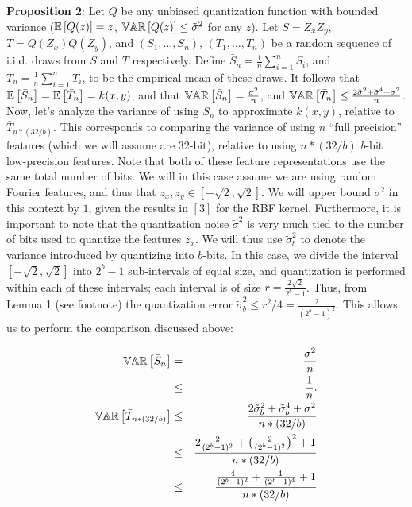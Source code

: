 \documentclass[12pt]{article}
\newcommand{\bS}{\bar{S}}
\newcommand{\bT}{\bar{T}}
\newcommand{\sq}{\sqrt{2}}
\newcommand{\tsigma}{\tilde{\sigma}}
\begin{document}
\noindent\textbf{Proposition 2}: Let $Q$ be any unbiased quantization function with bounded variance ($\expect{}{Q(z)} = z$, $\var{}{Q(z)} \leq \tsigma^2$ for any $z$).  Let $S=Z_x Z_y$, $T = Q(Z_x)Q(Z_y)$, and $(S_1,\ldots,S_n)$, $(T_1,\ldots,T_n)$ be a random sequence of i.i.d. draws from $S$ and $T$ respectively.  Define $\bar{S}_n = \frac{1}{n}\sum_{i=1}^n S_i$, and $\bar{T}_n =  \frac{1}{n}\sum_{i=1}^n T_i$, to be the empirical mean of these draws.  It follows that $\expect{}{\bS_n} = \expect{}{\bT_n} = k(x,y)$, and that
$\var{}{\bS_n} = \frac{\sigma^2}{n}$, and $\var{}{\bT_n} \leq \frac{2\tsigma^2 + \tsigma^4 +  \sigma^2}{n}$.\\

Now, let's analyze the variance of using $\bS_n$ to approximate $k(x,y)$, relative to $\bT_{n*(32/b)}$.  This corresponds to comparing the variance of using $n$ ``full precision''  features (which we will assume are 32-bit), relative to using $n*(32/b)$ $b$-bit low-precision features. Note that both of these feature representations use the same total number of bits.  We will in this case assume we are using random Fourier features, and thus that
$z_x,z_y \in [-\sq,\sq]$.  We will upper bound $\sigma^2$ in this context by $1$, given the results in $[3]$ for the RBF kernel.  Furthermore, it is important to note that the quantization noise $\tsigma^2$ is very much tied to the number of bits used to quantize the features $z_x$.  We will thus use $\tsigma_b^2$ to denote the variance introduced by quantizing into $b$-bits.  In this case, we divide the interval $[-\sq,\sq]$ into $2^b-1$ sub-intervals of equal size, and quantization is performed within each of these intervals; each interval is of size $r = \frac{2\sq}{2^b-1}$. 
Thus, from Lemma 1 (see footnote) the quantization error $\tsigma_b^2 \leq r^2/4 = \frac{2}{(2^b-1)^2}$.  This allows us to perform the comparison discussed above:

\begin{eqnarray*}
	\var{}{\bS_n} &=& \frac{\sigma^2}{n} \\
	&\leq& \frac{1}{n}. \\
	\var{}{\bT_{n*(32/b)}} &\leq& \frac{2\tsigma_b^2 + \tsigma_b^4 +  \sigma^2}{n*(32/b)} \\
	&\leq& \frac{2\frac{2}{(2^b-1)^2}  + \big(\frac{2}{(2^b-1)^2}\big)^2+ 1}{n*(32/b)}\\
	&\leq& \frac{\frac{4}{(2^b-1)^2} + \frac{4}{(2^b-1)^4} +  1}{n*(32/b)}\\
\end{eqnarray*}
\end{document}
